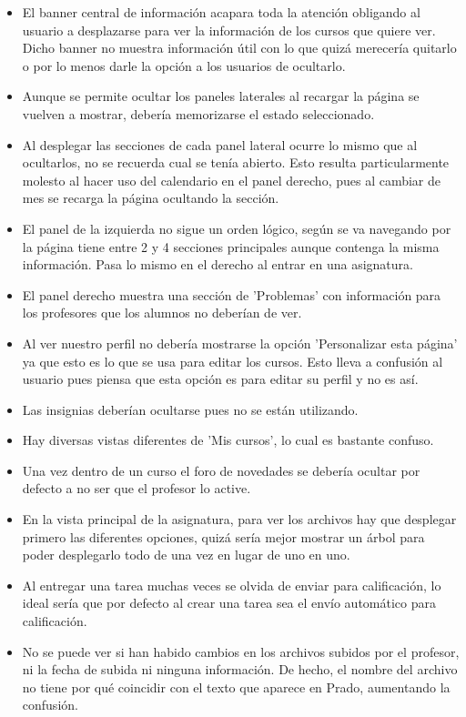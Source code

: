 \begin{itemize}
\item El banner central de información acapara toda la atención obligando al usuario a desplazarse para ver la información de los cursos que quiere ver. Dicho banner no muestra información útil con lo que quizá merecería quitarlo o por lo menos darle la opción a los usuarios de ocultarlo.
\item Aunque se permite ocultar los paneles laterales al recargar la página se vuelven a mostrar, debería memorizarse el estado seleccionado.
\item Al desplegar las secciones de cada panel lateral ocurre lo mismo que al ocultarlos, no se recuerda cual se tenía abierto. Esto resulta particularmente molesto al hacer uso del calendario en el panel derecho, pues al cambiar de mes se recarga la página ocultando la sección.
\item El panel de la izquierda no sigue un orden lógico, según se va navegando por la página tiene entre 2 y 4 secciones principales aunque contenga la misma información. Pasa lo mismo en el derecho al entrar en una asignatura.
\item El panel derecho muestra una sección de 'Problemas' con información para los profesores que los alumnos no deberían de ver.
\item Al ver nuestro perfil no debería mostrarse la opción 'Personalizar esta página' ya que esto es lo que se usa para editar los cursos. Esto lleva a confusión al usuario pues piensa que esta opción es para editar su perfil y no es así.
\item Las insignias deberían ocultarse pues no se están utilizando.
\item Hay diversas vistas diferentes de 'Mis cursos', lo cual es bastante confuso.
\item Una vez dentro de un curso el foro de novedades se debería ocultar por defecto a no ser que el profesor lo active.
\item En la vista principal de la asignatura, para ver los archivos hay que desplegar primero las diferentes opciones, quizá sería mejor mostrar un árbol para poder desplegarlo todo de una vez en lugar de uno en uno.
\item Al entregar una tarea muchas veces se olvida de enviar para calificación, lo ideal sería que por defecto al crear una tarea sea el envío automático para calificación.
\item No se puede ver si han habido cambios en los archivos subidos por el profesor, ni la fecha de subida ni ninguna información. De hecho, el nombre del archivo no tiene por qué coincidir con el texto que aparece en Prado, aumentando la confusión.

\end{itemize}
